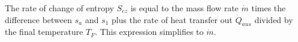 The rate of change of entropy \( S_{ez} \) is equal to the mass flow rate \( \dot{m} \) times the difference between \( s_a \) and \( s_1 \) plus the rate of heat transfer out \( \dot{Q}_{aus} \) divided by the final temperature \( T_F \). This expression simplifies to \( \dot{m} \).